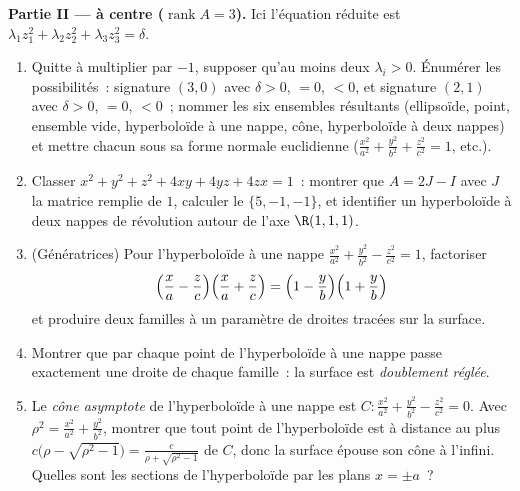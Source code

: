 \begin{problem}
\medskip
\noindent\textbf{Partie II ---  à centre
($\operatorname{rank}A = 3$).} Ici l'équation réduite est
$\lambda_1z_1^2 + \lambda_2z_2^2 + \lambda_3z_3^2 = \delta$.
\begin{enumerate}[resume]
  \item Quitte à multiplier par $-1$, supposer qu'au moins deux
        $\lambda_i > 0$. Énumérer les possibilités~:
        signature $(3, 0)$ avec $\delta > 0$, $= 0$, $< 0$,
        et signature $(2, 1)$ avec $\delta > 0$, $= 0$, $<
        0$~; nommer les six ensembles résultants (ellipsoïde,
        point, ensemble vide, hyperboloïde à une nappe, cône,
        hyperboloïde à deux nappes) et mettre chacun sous sa forme
        normale euclidienne ($\frac{x^2}{a^2} + \frac{y^2}{b^2} +
        \frac{z^2}{c^2} = 1$, etc.).
  \item Classer $x^2 + y^2 + z^2 + 4xy + 4yz + 4zx = 1$~:
        montrer que $A = 2J - I$ avec $J$ la matrice remplie de
        $1$, calculer le  $\{5, -1, -1\}$, et identifier un
        hyperboloïde à deux nappes de révolution autour de l'axe
        $\R(1,1,1)$.
  \item (Génératrices) Pour l'hyperboloïde à une nappe
        $\frac{x^2}{a^2} + \frac{y^2}{b^2} - \frac{z^2}{c^2}
        = 1$, factoriser
        \[
        \Bigl(\frac xa - \frac zc\Bigr)
        \Bigl(\frac xa + \frac zc\Bigr)
        = \Bigl(1 - \frac yb\Bigr)\Bigl(1 + \frac yb\Bigr)
        \]
        et produire deux familles à un paramètre de droites
        tracées sur la surface.
  \item Montrer que par chaque point de l'hyperboloïde à une
        nappe passe exactement une droite de chaque famille~:
        la surface est \emph{doublement réglée}.
  \item Le \emph{cône asymptote} de l'hyperboloïde à une
        nappe est $C : \frac{x^2}{a^2} + \frac{y^2}{b^2}
        - \frac{z^2}{c^2} = 0$. Avec $\rho^2 = \frac{x^2}{a^2}
        + \frac{y^2}{b^2}$, montrer que tout point de
        l'hyperboloïde est à distance au plus $c\bigl(\rho -
        \sqrt{\rho^2 - 1}\bigr) = \frac{c}{\rho +
        \sqrt{\rho^2 - 1}}$ de $C$, donc la surface épouse son
        cône à l'infini. Quelles sont les sections de
        l'hyperboloïde par les plans $x = \pm a$~?
\end{enumerate}


\end{problem}
